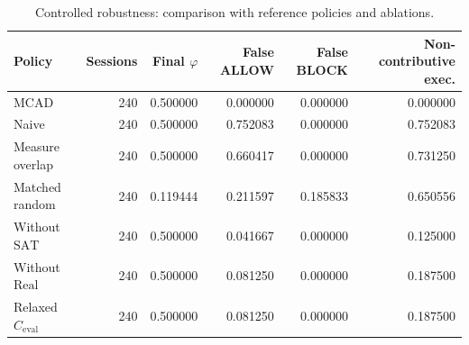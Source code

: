 \begin{table}[!t]
\centering
\caption{Controlled robustness: comparison with reference policies and ablations.}
\label{tab:robustness}
\small
\begin{tabular}{@{}p{}rrrrr@{}}
\toprule
Policy & Sessions & Final $\varphi$ & False ALLOW & False BLOCK & Non-contributive exec. \\
\midrule
MCAD & 240 & 0.500000 & 0.000000 & 0.000000 & 0.000000 \\
Naive & 240 & 0.500000 & 0.752083 & 0.000000 & 0.752083 \\
Measure overlap & 240 & 0.500000 & 0.660417 & 0.000000 & 0.731250 \\
Matched random & 240 & 0.119444 & 0.211597 & 0.185833 & 0.650556 \\
Without $\mathrm{SAT}$ & 240 & 0.500000 & 0.041667 & 0.000000 & 0.125000 \\
Without $\mathrm{Real}$ & 240 & 0.500000 & 0.081250 & 0.000000 & 0.187500 \\
Relaxed $C_{\mathrm{eval}}$ & 240 & 0.500000 & 0.081250 & 0.000000 & 0.187500 \\
\bottomrule
\end{tabular}
\end{table}
